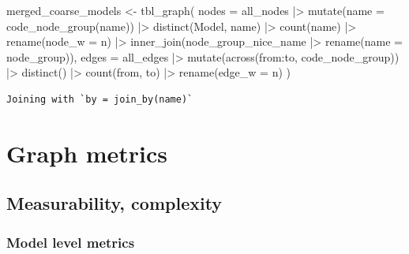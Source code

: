 \documentclass[
  letterpaper,
  DIV=11,
  numbers=noendperiod]{scrartcl}
\newenvironment{Shaded}{\begin{snugshade}}{\end{snugshade}}
\newcommand{\AttributeTok}[1]{\textcolor[rgb]{0.40,0.45,0.13}{#1}}
\newcommand{\FunctionTok}[1]{\textcolor[rgb]{0.28,0.35,0.67}{#1}}
\newcommand{\NormalTok}[1]{\textcolor[rgb]{0.00,0.23,0.31}{#1}}
\newcommand{\OtherTok}[1]{\textcolor[rgb]{0.00,0.23,0.31}{#1}}
\newcommand{\SpecialCharTok}[1]{\textcolor[rgb]{0.37,0.37,0.37}{#1}}
\begin{document}
\begin{Shaded}
\begin{Highlighting}[]
\NormalTok{merged\_coarse\_models }\OtherTok{\textless{}{-}} 
    \FunctionTok{tbl\_graph}\NormalTok{(}
        \AttributeTok{nodes =}\NormalTok{ all\_nodes }\SpecialCharTok{|\textgreater{}} 
            \FunctionTok{mutate}\NormalTok{(}\AttributeTok{name =} \FunctionTok{code\_node\_group}\NormalTok{(name)) }\SpecialCharTok{|\textgreater{}} 
            \FunctionTok{distinct}\NormalTok{(Model, name) }\SpecialCharTok{|\textgreater{}} 
            \FunctionTok{count}\NormalTok{(name) }\SpecialCharTok{|\textgreater{}} 
            \FunctionTok{rename}\NormalTok{(}\AttributeTok{node\_w =}\NormalTok{ n) }\SpecialCharTok{|\textgreater{}} 
            \FunctionTok{inner\_join}\NormalTok{(node\_group\_nice\_name }\SpecialCharTok{|\textgreater{}} \FunctionTok{rename}\NormalTok{(}\AttributeTok{name =}\NormalTok{ node\_group)),}
        \AttributeTok{edges =}\NormalTok{ all\_edges }\SpecialCharTok{|\textgreater{}} 
            \FunctionTok{mutate}\NormalTok{(}\FunctionTok{across}\NormalTok{(from}\SpecialCharTok{:}\NormalTok{to, code\_node\_group)) }\SpecialCharTok{|\textgreater{}} 
            \FunctionTok{distinct}\NormalTok{() }\SpecialCharTok{|\textgreater{}} 
            \FunctionTok{count}\NormalTok{(from, to) }\SpecialCharTok{|\textgreater{}} 
            \FunctionTok{rename}\NormalTok{(}\AttributeTok{edge\_w =}\NormalTok{ n)}
\NormalTok{    )}
\end{Highlighting}
\end{Shaded}

\begin{verbatim}
Joining with `by = join_by(name)`
\end{verbatim}

\section{Graph metrics}\label{graph-metrics}

\subsection{Measurability, complexity}\label{measurability-complexity}

\subsubsection{Model level metrics}\label{model-level-metrics}
\end{document}

